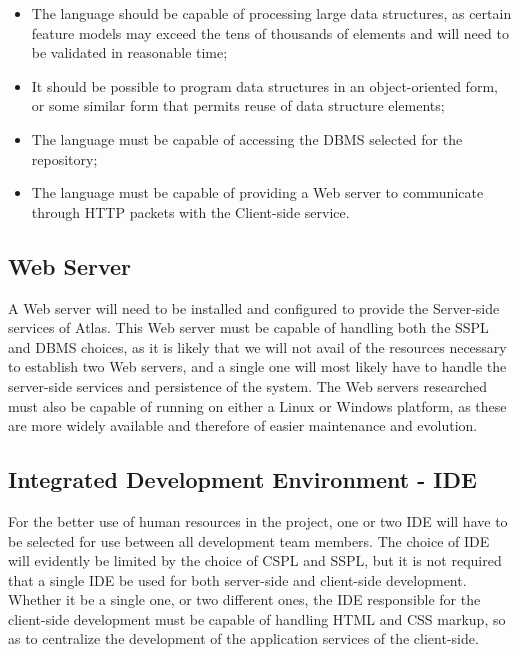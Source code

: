 \begin{itemize}
    \item The language should be capable of processing large data structures, as certain feature models may exceed the tens of thousands of elements and will need to be validated in reasonable time;
    \item It should be possible to program data structures in an object-oriented form, or some similar form that permits reuse of data structure elements;
    \item The language must be capable of accessing the DBMS selected for the repository;
    \item The language must be capable of providing a Web server to communicate through HTTP packets with the Client-side service.
\end{itemize}


\subsection{Web Server}

A Web server will need to be installed and configured to provide the Server-side services of Atlas. This Web server must be capable of handling both the SSPL and DBMS choices, as it is likely that we will not avail of the resources necessary to establish two Web servers, and a single one will most likely have to handle the server-side services and persistence of the system. The Web servers researched must also be capable of running on either a Linux or Windows platform, as these are more widely available and therefore of easier maintenance and evolution.


\subsection{Integrated Development Environment - IDE}

For the better use of human resources in the project, one or two IDE will have to be selected for use between all development team members. The choice of IDE will evidently be limited by the choice of CSPL and SSPL, but it is not required that a single IDE be used for both server-side and client-side development. Whether it be a single one, or two different ones, the IDE responsible for the client-side development must be capable of handling HTML and CSS markup, so as to centralize the development of the application services of the client-side.

